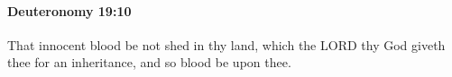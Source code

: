 
		\paragraph{Deuteronomy 19:10} %
			\label{DEUTERONOMY-19-10}

			That innocent blood be not shed in thy land, which the LORD thy God giveth thee for an inheritance, and so blood be upon thee.


